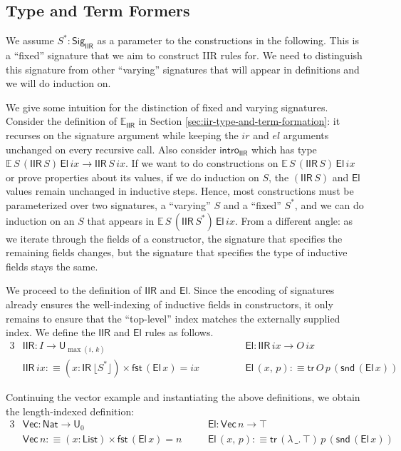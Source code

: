 \documentclass[acmsmall,screen,review]{acmart}
\newcommand{\mit}[1]{{\mathit{#1}}}
\newcommand{\msf}[1]{{\mathsf{#1}}}
\newcommand{\mbb}[1]{\mathbb{#1}}
\newcommand{\U}{\msf{U}}
\newcommand{\Nat}{\msf{Nat}}
\newcommand{\List}{\msf{List}}
\newcommand{\El}{\msf{El}}
\newcommand{\Sig}{\msf{Sig}}
\newcommand{\ix}{{ix}}
\newcommand{\IR}{\msf{IR}}
\newcommand{\intro}{\msf{intro}}
\newcommand{\tr}{\msf{tr}}
\newcommand{\fst}{\msf{fst}}
\newcommand{\snd}{\msf{snd}}
\newcommand{\IIR}{\msf{IIR}}
\newcommand{\Sigr}[1]{\lfloor #1 \rfloor}
\newcommand{\Vect}{\msf{Vec}}
\newcommand{\E}{\mbb{E}}
\begin{document}
\subsection{Type and Term Formers}\label{sec:iir-construction-type-term}
We assume $S^* : \Sig_\IIR$ as a parameter to the constructions in the following. This is a
``fixed'' signature that we aim to construct IIR rules for. We need to distinguish this signature
from other ``varying'' signatures that will appear in definitions and we will do induction on.

We give some intuition for the distinction of fixed and varying signatures. Consider the definition
of $\E_{\IIR}$ in Section \ref{sec:iir-type-and-term-formation}: it recurses on the signature
argument while keeping the $\mit{ir}$ and $\mit{el}$ arguments unchanged on every recursive call.
Also consider $\intro_{\IIR}$ which has type $\E\,S\,(\IIR\,S)\,\El\,\mit{ix} \to
\IIR\,S\,\mit{ix}$. If we want to do constructions on $\E\,S\,(\IIR\,S)\,\El\,\mit{ix}$ or
prove properties about its values, if we do induction on $S$, the $(\IIR\,S)$ and $\El$ values
remain unchanged in inductive steps. Hence, most constructions must be parameterized over two
signatures, a ``varying'' $S$ and a ``fixed'' $S^*$, and we can do induction on an $S$ that appears
in $\E\,S\,(\IIR\,S^*)\,\El\,\mit{ix}$. From a different angle: as we iterate through the fields
of a constructor, the signature that specifies the remaining fields changes, but the signature
that specifies the type of inductive fields stays the same.

We proceed to the definition of $\IIR$ and $\El$. Since the encoding of signatures already ensures
the well-indexing of inductive fields in constructors, it only remains to ensure that the
``top-level'' index matches the externally supplied index. We define the $\IIR$ and $\El$ rules as
follows.
\begin{alignat*}{3}
  &\IIR : I \to \U_{\max(i,\,k)}                         && \El : \IIR\,\ix \to O\,\ix \\
  &\IIR\,\ix :\equiv (x : \IR\,\Sigr{S^*}) \times \fst\,(\El\,x) = \ix \hspace{3em}&& \El\,(x,\,p) :\equiv \tr\,O\,p\,(\snd\,(\El\,x))
\end{alignat*}
\begin{example} Continuing the vector example and instantiating the above definitions, we obtain the length-indexed definition:
  \begin{alignat*}{3}
    &\Vect : \Nat \to \U_0                                        &&\El : \Vect\,n \to \top\\
    &\Vect\,n :\equiv (x : \List) \times \fst\,(\El\,x) = n\quad  &&\El\,(x,\,p) :\equiv \tr\,(\lambda\,\_.\,\top)\,p\,(\snd\,(\El\,x))
  \end{alignat*}
\end{example}
\end{document}
